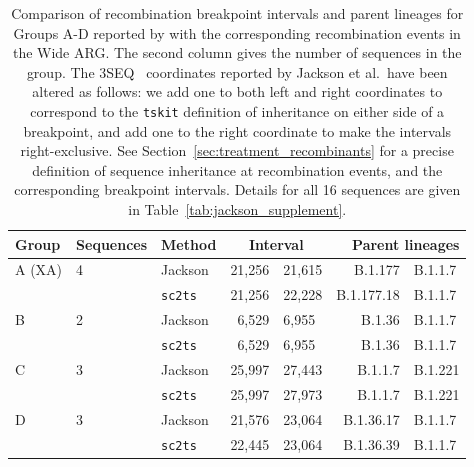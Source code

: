\documentclass{article}
\begin{document}
\begin{table} \centering
\begin{tabular}{lllr@{--}lr@{+}l}
\toprule
Group        & Sequences & Method & \multicolumn{2}{c}{Interval}
    & \multicolumn{2}{r}{Parent lineages} \\
\midrule
A (XA)       & 4   & Jackson        &  21,256&21,615 & B.1.177&B.1.1.7 \\
             &     &\texttt{sc2ts} &  21,256&22,228 & B.1.177.18&B.1.1.7 \\
\cmidrule{3-7}
B            & 2   & Jackson        &  6,529&6,955 & B.1.36&B.1.1.7  \\
             &     &\texttt{sc2ts} &  6,529&6,955 & B.1.36&B.1.1.7  \\
\cmidrule{3-7}
C            & 3   &Jackson        &  25,997&27,443 &  B.1.1.7&B.1.221 \\
             &     & \texttt{sc2ts} &  25,997&27,973 &  B.1.1.7&B.1.221 \\
\cmidrule{3-7}
D            & 3   & Jackson        &  21,576&23,064 &  B.1.36.17&B.1.1.7 \\
             &     & \texttt{sc2ts} &  22,445&23,064 &  B.1.36.39&B.1.1.7 \\
\bottomrule
\end{tabular}
\caption{\label{tab:jackson}Comparison of recombination breakpoint
intervals and parent lineages for Groups A-D
reported by \cite{Jackson2021-ik} with the corresponding
recombination events in the Wide ARG.
The second column gives the number of sequences in the group.
The 3SEQ~\citep{boni2007exact} coordinates
reported by Jackson et al.\ have been altered as follows: we
add one to both left and right coordinates to correspond to the
\texttt{tskit} definition of inheritance on either side of a breakpoint,
and add one to the right coordinate to make the intervals
right-exclusive. See Section~\ref{sec:treatment_recombinants}
for a precise definition of sequence inheritance at recombination
events, and the corresponding breakpoint intervals.
Details for all 16 sequences are
given in Table~\ref{tab:jackson_supplement}.}
\end{table}
\end{document}

